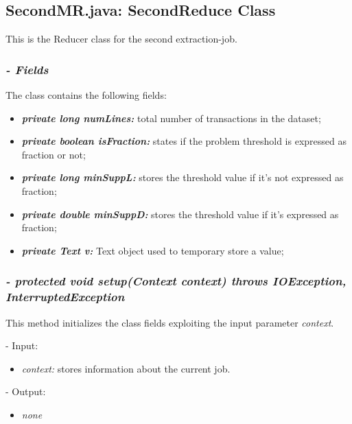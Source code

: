 \documentclass[]{report}
\begin{document}
	
	\subsection*{SecondMR.java: SecondReduce Class}
	This is the Reducer class for the second extraction-job.
	\subsubsection*{\textit{\textbf{-} Fields}} 
	The class contains the following fields:
	\begin{itemize}
		\item \textit{\textbf{private long numLines:}} total number of transactions in the dataset;
		\item \textit{\textbf{private boolean isFraction:}} states if the problem threshold is expressed as fraction or not;
		\item \textit{\textbf{private long minSuppL:}} stores the threshold value if it's not expressed as fraction; 
		\item \textit{\textbf{private double minSuppD:}} stores the threshold value if it's expressed as fraction;
		\item \textit{\textbf{private Text v:}} Text object used to temporary store a value;	
	\end{itemize}
	
	\subsubsection*{\textit{\textbf{-} protected void setup(Context context) throws IOException, InterruptedException}}   	
	This method initializes the class fields exploiting the input parameter \textit{context}.   
	\begin{description}
		\item - Input:
		\begin{itemize}
			\item \textit{context:} stores information about the current job.
		\end{itemize}
	\end{description}	
	\begin{description}
		\item - Output:
		\begin{itemize}
			\item \textit{none} 
		\end{itemize}
	\end{description}
	
\end{document}
